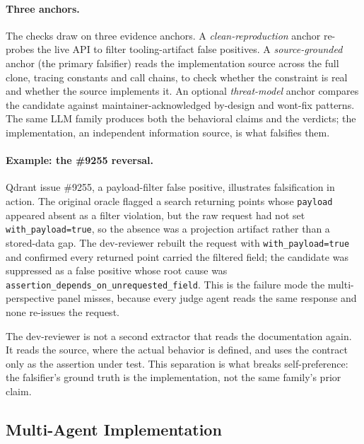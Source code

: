 \documentclass[sigconf]{acmart}
\begin{document}
\paragraph{Three anchors.}
The checks draw on three evidence anchors. A \emph{clean-reproduction} anchor re-probes the live API to filter tooling-artifact false positives. A \emph{source-grounded} anchor (the primary falsifier) reads the implementation source across the full clone, tracing constants and call chains, to check whether the constraint is real and whether the source implements it. An optional \emph{threat-model} anchor compares the candidate against maintainer-acknowledged by-design and wont-fix patterns. The same LLM family produces both the behavioral claims and the verdicts; the implementation, an independent information source, is what falsifies them.

\paragraph{Example: the \#9255 reversal.}
Qdrant issue \#9255, a payload-filter false positive, illustrates falsification in action. The original oracle flagged a search returning points whose \texttt{payload} appeared absent as a filter violation, but the raw request had not set \texttt{with\_payload=true}, so the absence was a projection artifact rather than a stored-data gap. The dev-reviewer rebuilt the request with \texttt{with\_payload=true} and confirmed every returned point carried the filtered field; the candidate was suppressed as a false positive whose root cause was \texttt{assertion\_depends\_on\_unrequested\_field}. This is the failure mode the multi-perspective panel misses, because every judge agent reads the same response and none re-issues the request.

The dev-reviewer is not a second extractor that reads the documentation again. It reads the source, where the actual behavior is defined, and uses the contract only as the assertion under test. This separation is what breaks self-preference: the falsifier's ground truth is the implementation, not the same family's prior claim.

\subsection{Multi-Agent Implementation}
\label{subsec:multiagent}
\end{document}
